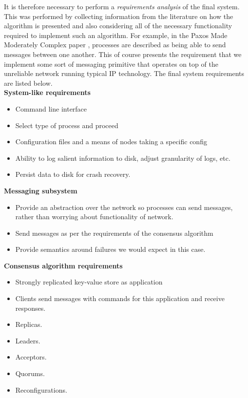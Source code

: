 {It is therefore necessary to perform a \emph{requirements analysis} of the final system. This was performed by collecting information from the literature on how the algorithm is presented and also considering all of the necessary functionality required to implement such an algorithm. For example, in the Paxos Made Moderately Complex paper \cite{VanRenesse:2015:PMM:2737799.2673577}, processes are described as being able to send messages between one another. This of course presents the requirement that {\color{red}we} implement some sort of messaging primitive that operates on top of the unreliable network running typical IP technology. The final system requirements are listed below. \\

\textbf{System-like requirements}
\begin{itemize}
  \item Command line interface
  \item Select type of process and proceed
  \item Configuration files and a means of nodes taking a specific config
  \item Ability to log salient information to disk, adjust granularity of logs, etc.
  \item {\color{red}Persist data to disk for crash recovery.}
\end{itemize}

\textbf{Messaging subsystem}
\begin{itemize}
  \item Provide an abstraction over the network so processes can send messages, rather than worrying about functionality of network.
  \item Send messages as per the requirements of the consensus algorithm
  \item Provide semantics around failures we would expect in this case.
\end{itemize}

\textbf{Consensus algorithm requirements}
\begin{itemize}
  \item Strongly replicated key-value store as application
  \item Clients send messages with commands for this application and receive responses.
  \item Replicas.
  \item Leaders.
  \item Acceptors.
  \item Quorums.
  \item {\color{red}Reconfigurations.}
\end{itemize}

}
